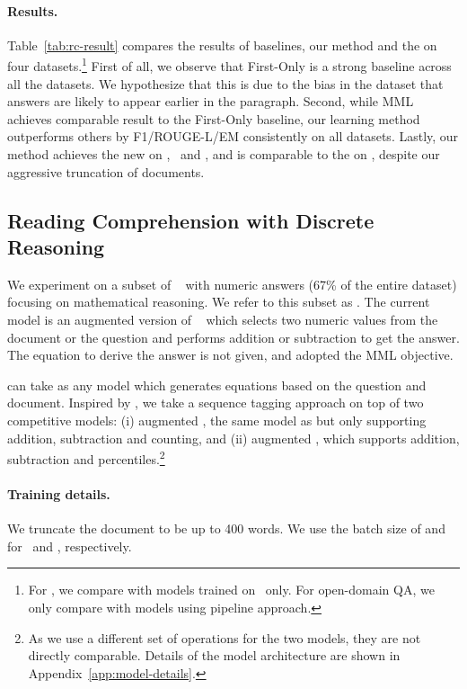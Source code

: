 \documentclass[11pt,a4paper]{article}
\begin{document}
\paragraph{Results.}
Table~\ref{tab:rc-result} compares the results of baselines, our method and the \sota{} on four datasets.\footnote{For \narrative, we compare with models trained on \narrative\ only. For open-domain QA, we only compare with models using pipeline approach.} First of all, we observe that First-Only is a strong baseline across all the datasets. We hypothesize that this is due to the bias in the dataset that answers are likely to appear earlier in the paragraph.
Second, while MML achieves comparable result to the First-Only baseline, our learning method outperforms others by  F1/ROUGE-L/EM consistently on all datasets.
Lastly, our method achieves the new \sota{} on \narrative{}, \triviaopen\ and \nqopen, and is comparable to the \sota{} on \trivia{}, despite our aggressive truncation of documents. 


\subsection{Reading Comprehension with Discrete Reasoning}\label{subsec:descrete-reasoning-result}
We experiment on a subset of \drop~\citep{drop} with numeric answers (67\% of the entire dataset) focusing on mathematical reasoning. We refer to this subset as  \drop{}. The current \sota{} model is an augmented version of \qanet{}~\cite{fast-and-accurate} which selects two numeric values from the document or the question and performs addition or subtraction to get the answer. The equation to derive the answer is not given, and \citet{drop} adopted the MML objective.


 can take as any model which generates equations based on the question and document. Inspired by \citet{drop}, we take a sequence tagging approach on top of two competitive models: (i) augmented \qanet{}, the same model as \citet{drop} but only supporting addition, subtraction and counting, and (ii) augmented \bert{}, which supports addition, subtraction and percentiles.\footnote{As we use a different set of operations for the two models, they are not directly comparable. Details of the model architecture are shown in Appendix~\ref{app:model-details}.} 

\paragraph{Training details.}
We truncate the document to be up to 400 words. 
We use the batch size of  and  for \qanet\ and \bert, respectively.
\end{document}
